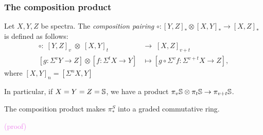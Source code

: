 \documentclass{MetricNotes2023}
\def\bb{\ensuremath\mathbb}
\def\textcolour{\textcolor}
\begin{document}
\subsubsection{The composition product}

\begin{definition}
Let \(X, Y, Z\) be spectra. The \textit{composition pairing} \(\circ : [Y, Z]_* \otimes [X,Y]_* \to [X,Z]_*\) is defined as follows: 
\begin{align*}
\circ :\; [Y, Z]_v\; \otimes \;[X,Y]_t\; &\to\; [X,Z]_{v+t}\\
[g : \Sigma^v Y \to Z]\otimes [f : \Sigma^t X\to Y] &\mapsto [g \circ \Sigma^v f : \Sigma^{v+t}X\to Z],
\end{align*}
where \([X,Y]_n=[\Sigma^n X, Y]\) %
\end{definition}

In particular, if \(X=Y=Z=\bb{S}\), we have a product \(\pi_v \bb{S}\otimes \pi_t \bb{S}\to \pi_{v+t}\bb{S}\).%

\begin{lemma}
The composition product makes \(\pi_*^S\) into a graded commutative ring. 
\end{lemma}

\textcolour{violet}{(proof)}
\end{document}
